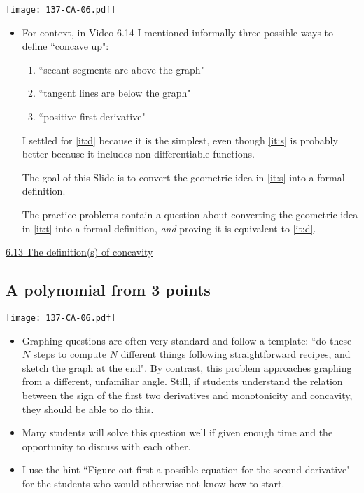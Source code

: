 \documentclass[11pt]{article}
\newcommand{\nl}{\hfill \vspace{-1.1\baselineskip}} %
\newcommand{\vxiii}{\hspace{8mm} \href{https://www.youtube.com/watch?v=4Dh6KdQDRkw&list=PLlwePzQY_wW9EsqbQzPdJTNGsHYvO_2CJ&index=13}{6.13 The definition(s) of concavity}}
\begin{document}
\begin{center}
{ \texttt{[image: 137-CA-06.pdf]}}
\end{center}


\begin{comments}
\nl
	\begin{itemize}
		\item For context, in Video 6.14 I mentioned informally three possible ways to define ``concave up":
			\begin{enumerate}
				\item \label{it:s} ``secant segments are above the graph"
				\item \label{it:t} ``tangent lines are below the graph"
				\item  \label{it:d} ``positive first derivative"
			\end{enumerate}
		I settled for \ref{it:d} because it is the simplest, even though \ref{it:s} is probably better because it includes non-differentiable functions.
		
		The goal of this Slide is to convert the geometric idea in \ref{it:s} into a formal definition.
		
		The practice problems contain a question about converting the geometric idea in \ref{it:t} into a formal definition, \emph{and} proving it is equivalent to \ref{it:d}.
	\end{itemize}
\end{comments}

\begin{videos}
\vxiii
\end{videos}

\newpage
\subsection{A polynomial from 3 points}

\begin{center}
{ \texttt{[image: 137-CA-06.pdf]}}
\end{center}


\begin{comments}
\nl
	\begin{itemize}
		\item  Graphing questions are often very standard and follow a template: ``do these $N$ steps to compute $N$ different things following straightforward recipes, and sketch the graph at the end".  By contrast, this problem approaches graphing from a different, unfamiliar angle.  Still, if students understand the relation between the sign of the first two derivatives and monotonicity and concavity, they should be able to do this.
		\item  Many students will solve this question well if given enough time and the opportunity to discuss with each other.
		\item I use the hint ``Figure out first a possible equation for the second derivative" for the students who would otherwise not know how to start.
	\end{itemize}
\end{comments}
\end{document}
